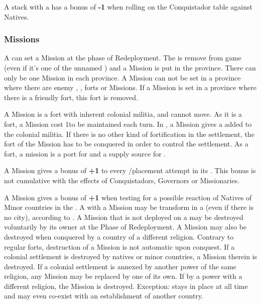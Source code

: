 \aparag[Conquistadors.] A stack with a \LeaderMis has a bonus of {\bf -1} when
rolling on the Conquistador table against Natives.

\subsubsection{Missions}
\aparag A \LeaderMis can set a Mission at the phase of Redeployment. The
\LeaderMis is remove from game (even if it's one of the unnamed \HIS
\LeaderMis) and a Mission is put in the province.
\bparag There can only be one Mission in each province. A Mission can not be
set in a province where there are enemy \COL, \TP, forts or Missions. If a
Mission is set in a province where there is a friendly fort, this fort is
removed.

\aparag A Mission is a fort with inherent colonial militia, and cannot
move. As it is a fort, a Mission cost 1\ducats to be maintained each turn.
\bparag In \COL, a Mission gives a \LDE added to the colonial militia.
\bparag If there is no other kind of fortification in the settlement, the fort
of the Mission has to be conquered in order to control the settlement.
\bparag As a fort, a mission is a port for \ND and a supply source for \LD.

\aparag A Mission gives a bonus of {\bf +1} to every \TP/\COL placement
attempt in its \Area.
\bparag This bonus is not cumulative with the effects of Conquistadors,
Governors or Missionaries.

\aparag A Mission gives a bonus of {\bf +1} when testing for a possible
reaction of Natives of Minor countries in the \Area.
\aparag A \TP with a Mission may be transform in a \COL (even if there is no
city), according to .
\aparag A Mission that is not deployed on a \COL may be destroyed voluntarily
by its owner at the Phase of Redeployment.
\bparag A Mission may also be destroyed when conquered by a country of a
different religion. Contrary to regular forts, destruction of a Mission is not
automatic upon conquest.
\bparag If a colonial settlement is destroyed by natives or minor countries, a
Mission therein is destroyed.
\bparag If a colonial settlement is annexed by another power of the same
religion, any Mission may be replaced by one of its own. If by a power with a
different religion, the Mission is destroyed.
\bparag Exception:  stays in place at all time and may
even co-exist with an establishment of another country.

